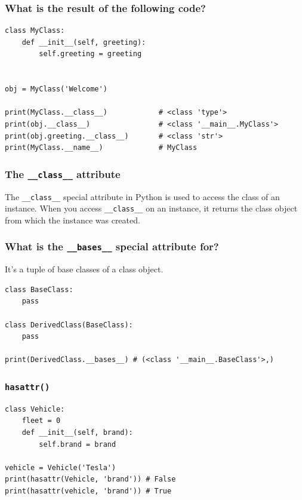 \subsubsection{What is the result of the following code?}
\begin{codebox}
\begin{verbatim}
class MyClass:
    def __init__(self, greeting):
        self.greeting = greeting
 
 
obj = MyClass('Welcome')
 
print(MyClass.__class__)            # <class 'type'>
print(obj.__class__)                # <class '__main__.MyClass'>
print(obj.greeting.__class__)       # <class 'str'>
print(MyClass.__name__)             # MyClass
\end{verbatim}
\end{codebox}

\subsubsection{The \texttt{\_\_class\_\_} attribute}
The \texttt{\_\_class\_\_} special attribute in Python is used to access the class of an instance. When you access \texttt{\_\_class\_\_} on an instance, it returns the class object from which the instance was created.\\

\newpage
\subsubsection{What is the \texttt{\_\_bases\_\_} special attribute for?}
It's a tuple of base classes of a class object.
\begin{codebox}
\begin{verbatim}
class BaseClass:
    pass
 
class DerivedClass(BaseClass):
    pass
 
print(DerivedClass.__bases__) # (<class '__main__.BaseClass'>,)
\end{verbatim}
\end{codebox}

\subsubsection{\texttt{hasattr()}}
\begin{codebox}
\begin{verbatim}
class Vehicle:
    fleet = 0
    def __init__(self, brand):
        self.brand = brand

vehicle = Vehicle('Tesla')
print(hasattr(Vehicle, 'brand')) # False
print(hasattr(vehicle, 'brand')) # True
\end{verbatim}
\end{codebox}


